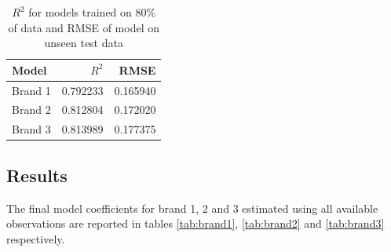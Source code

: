 \documentclass[a4paper,11pt]{article}
\begin{document}
\begin{table}
\centering
\caption{$R^2$ for models trained on 80\% of data and RMSE of model on unseen test data}\label{tab:val-results}
\begin{tabular}{lrr}
\toprule
Model &        $R^2$ &      RMSE \\
\midrule
Brand 1 &  0.792233 &  0.165940 \\
Brand 2 &  0.812804 &  0.172020 \\
Brand 3 &  0.813989 &  0.177375 \\
\bottomrule
\end{tabular}
\end{table}


\subsection{Results}
The final model coefficients for brand 1, 2 and 3 estimated using all available observations are reported in tables \ref{tab:brand1}, \ref{tab:brand2} and \ref{tab:brand3} respectively.
\end{document}

